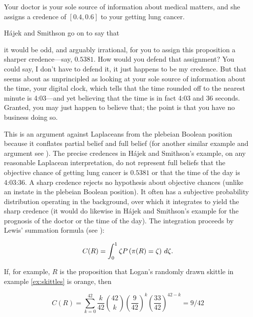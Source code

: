 \documentclass[12pt]{article}
\begin{document}
\begin{quotex}
  \label{ex:crude} Your doctor is your
  sole source of information about medical matters, and she assigns a
  credence of $[0.4,0.6]$ to your getting lung cancer.
\end{quotex}

H{\'a}jek and Smithson go on to say that 

\begin{quotex}
  it would be odd, and arguably irrational, for you to assign this
  proposition a sharper credence---say, $0.5381$. How would you defend
  that assignment? You could say, I don't have to defend it, it just
  happens to be my credence. But that seems about as unprincipled as
  looking at your sole source of information about the time, your
  digital clock, which tells that the time rounded off to the nearest
  minute is 4:03---and yet believing that the time is in fact 4:03 and
  36 seconds. Granted, you may just happen to believe that; the point
  is that you have no business doing so.
\end{quotex}

This is an argument against Laplaceans from the plebeian Boolean
position because it conflates partial belief and full belief (for
another similar example and argument see ).
The precise credences in H{\'a}jek and Smithson's example, on any
reasonable Laplacean interpretation, do not represent full beliefs
that the objective chance of getting lung cancer is $0.5381$ or that
the time of the day is 4:03:36. A sharp credence rejects no hypothesis
about objective chances (unlike an instate in the plebeian Boolean
position). It often has a subjective probability distribution
operating in the background, over which it integrates to yield the
sharp credence (it would do likewise in H{\'a}jek and Smithson's
example for the prognosis of the doctor or the time of the
day). The integration proceeds by Lewis' summation formula
(see ):

\begin{equation}
  \label{eq:s2}
  C(R)=\int_{0}^{1}\zeta{}P\left(\pi(R)=\zeta\right)\,d\zeta{}.\bcut{21}
\end{equation}

{\noindent}If, for example, $R$ is the proposition that Logan's
randomly drawn skittle in example \ref{ex:skittles} is orange, then

\begin{equation}
  \label{eq:skit}
  C(R)=\sum_{k=0}^{42}\frac{k}{42}\binom{42}{k}\left(\frac{9}{42}\right)^{k}\left(\frac{33}{42}\right)^{42-k}=9/42
\end{equation}
\end{document}

